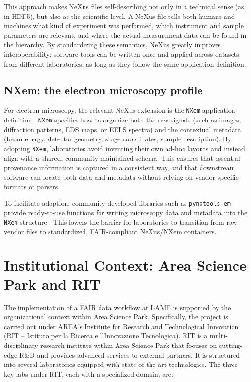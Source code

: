 This approach makes NeXus files self-describing not only in a technical sense (as in HDF5), but also at the scientific level. 
A NeXus file tells both humans and machines what kind of experiment was performed, which instrument and sample parameters are relevant, and where the actual measurement data can be found in the hierarchy. 
By standardizing these semantics, NeXus greatly improves interoperability: software tools can be written once and applied across datasets from different laboratories, as long as they follow the same application definition.

\subsection{NXem: the electron microscopy profile}

For electron microscopy, the relevant NeXus extension is the \texttt{NXem} application definition \parencite{bazzocchiNexusEM,nexusEMStructure}. 
\texttt{NXem} specifies how to organize both the raw signals (such as images, diffraction patterns, EDS maps, or EELS spectra) and the contextual metadata (beam energy, detector geometry, stage coordinates, sample description). 
By adopting \texttt{NXem}, laboratories avoid inventing their own ad-hoc layouts and instead align with a shared, community-maintained schema. 
This ensures that essential provenance information is captured in a consistent way, and that downstream software can locate both data and metadata without relying on vendor-specific formats or parsers.

To facilitate adoption, community-developed libraries such as \texttt{pynxtools-em} provide ready-to-use functions for writing microscopy data and metadata into the \texttt{NXem} structure \parencite{pynxtools_nexus_validation}. 
This lowers the barrier for laboratories to transition from raw vendor files to standardized, FAIR-compliant NeXus/NXem containers.

\section{Institutional Context: Area Science Park and RIT}

The implementation of a FAIR data workflow at LAME is supported by the organizational context within Area Science Park. Specifically, the project is carried out under AREA’s Institute for Research and Technological Innovation (RIT – Istituto per la Ricerca e l’Innovazione Tecnologica). RIT is a multi-disciplinary research institute within Area Science Park that focuses on cutting-edge R\&D and provides advanced services to external partners. It is structured into several laboratories equipped with state-of-the-art technologies. The three key labs under RIT, each with a specialized domain, are:


